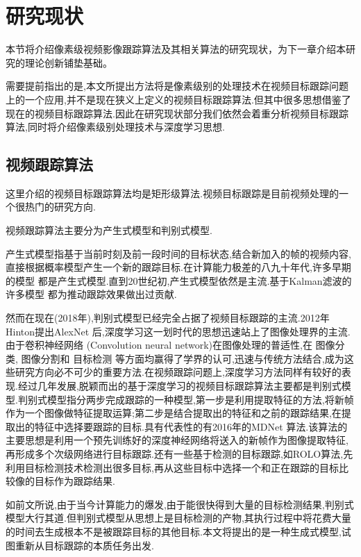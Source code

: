 
\section{研究现状}
本节将介绍像素级视频影像跟踪算法及其相关算法的研究现状，为下一章介绍本研究的理论创新铺垫基础。
\par
需要提前指出的是,本文所提出方法将是像素级别的处理技术在视频目标跟踪问题上的一个应用,并不是现在狭义上定义的视频目标跟踪算法.但其中很多思想借鉴了现在的视频目标跟踪算法.因此在研究现状部分我们依然会着重分析视频目标跟踪算法,同时将介绍像素级别处理技术与深度学习思想.

\subsection{视频跟踪算法}
这里介绍的视频目标跟踪算法均是矩形级算法.视频目标跟踪是目前视频处理的一个很热门的研究方向.
\par
视频跟踪算法主要分为产生式模型和判别式模型.
\par
产生式模型指基于当前时刻及前一段时间的目标状态,结合新加入的帧的视频内容,直接根据概率模型产生一个新的跟踪目标.在计算能力极差的八九十年代,许多早期的模型
\supercite{schalkoff1982model}
都是产生式模型.直到20世纪初,产生式模型依然是主流.基于Kalman滤波的许多模型
\supercite{kim2002fast, weng2006video, comaniciu2003kernel}
都为推动跟踪效果做出过贡献.
\par
然而在现在(2018年),判别式模型已经完全占据了视频目标跟踪的主流.2012年Hinton提出AlexNet 
\supercite{krizhevsky2012imagenet} 
后,深度学习这一划时代的思想迅速站上了图像处理界的主流.由于卷积神经网络
\supercite{krizhevsky2012imagenet} 
(Convolution neural network)在图像处理的普适性,在
图像分类\supercite{krizhevsky2012imagenet, witten2016data, he2016deep},
图像分割\supercite{long2015fully}和
目标检测\supercite{ren2015faster, redmon2016you}
等方面均赢得了学界的认可,迅速与传统方法结合,成为这些研究方向必不可少的重要方法.在视频跟踪问题上,深度学习方法同样有较好的表现.经过几年发展,脱颖而出的基于深度学习的视频目标跟踪算法主要都是判别式模型.判别式模型指分两步完成跟踪的一种模型,第一步是利用提取特征的方法,将新帧作为一个图像做特征提取运算;第二步是结合提取出的特征和之前的跟踪结果,在提取出的特征中选择要跟踪的目标.具有代表性的有2016年的MDNet \supercite{nam2016mdnet}算法.该算法的主要思想是利用一个预先训练好的深度神经网络将送入的新帧作为图像提取特征,再形成多个次级网络进行目标跟踪.还有一些基于检测的目标跟踪,如ROLO\supercite{ning2016spatially}算法,先利用目标检测技术检测出很多目标,再从这些目标中选择一个和正在跟踪的目标比较像的目标作为跟踪结果.
\par
如前文所说,由于当今计算能力的爆发,由于能很快得到大量的目标检测结果,判别式模型大行其道.但判别式模型从思想上是目标检测的产物,其执行过程中将花费大量的时间去生成根本不是被跟踪目标的其他目标.本文将提出的是一种生成式模型,试图重新从目标跟踪的本质任务出发.

